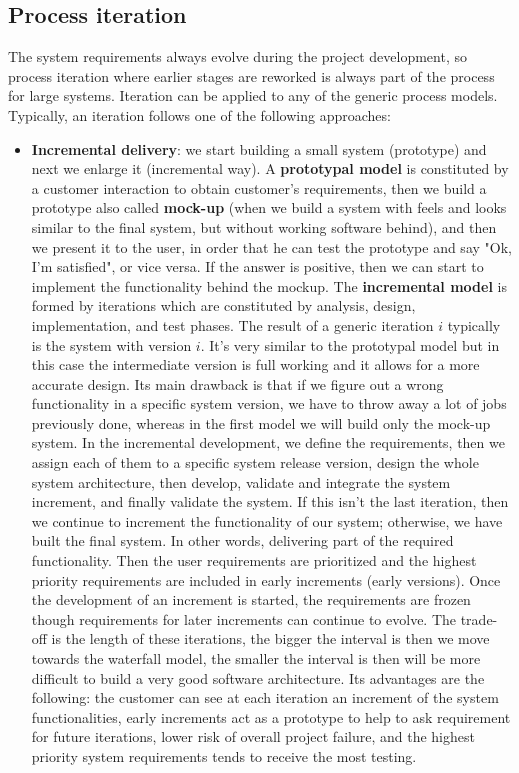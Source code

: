 \subsection{Process iteration}
The system requirements always evolve during the project development, so process iteration where earlier stages are reworked is always part of the process for large systems.
Iteration can be applied to any of the generic process models.
Typically, an iteration follows one of the following approaches:
\begin{itemize}
    \item \textbf{Incremental delivery}: we start building a small system (prototype) and next we enlarge it (incremental way). A \textbf{prototypal model} is constituted by a customer interaction to obtain customer's requirements, then we build a prototype also called \textbf{mock-up}  (when we build a system with feels and looks similar to the final system, but without working software behind), and then we present it to the user, in order that he can test the prototype and say "Ok, I'm satisfied", or vice versa. If the answer is positive, then we can start to implement the functionality behind the mockup. The \textbf{incremental model} is formed by iterations which are constituted by analysis, design, implementation, and test phases. The result of a generic iteration $i$ typically is the system with version $i$. It's very similar to the prototypal model but in this case the intermediate version is full working and it allows for a more accurate design. Its main drawback is that if we figure out a wrong functionality in a specific system version, we have to throw away a lot of jobs previously done, whereas in the first model we will build only the mock-up system. In the incremental development, we define the requirements, then we assign each of them to a specific system release version, design the whole system architecture, then develop, validate and integrate the system increment, and finally validate the system. If this isn't the last iteration, then we continue to increment the functionality of our system; otherwise, we have built the final system. In other words, delivering part of the required functionality. Then the user requirements are prioritized and the highest priority requirements are included in early increments (early versions). Once the development of an increment is started, the requirements are frozen though requirements for later increments can continue to evolve. The trade-off is the length of these iterations, the bigger the interval is then we move towards the waterfall model, the smaller the interval is then will be more difficult to build a very good software architecture. Its advantages are the following: the customer can see at each iteration an increment of the system functionalities, early increments act as a prototype to help to ask requirement for future iterations, lower risk of overall project failure, and the highest priority system requirements tends to receive the most testing.

\end{itemize}

